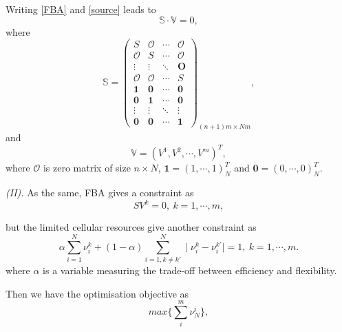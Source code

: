 \documentclass[paper=a4, fontsize=12pt]{scrartcl}	%
\numberwithin{equation}{section}					%
\numberwithin{figure}{section}					%
\numberwithin{table}{section}					%
\begin{document}
Writing \eqref{FBA} and \eqref{source} leads to 
\begin{equation}
\mathbb S\cdot \mathbb V=0,
\end{equation}
where 
\begin{equation}
\nonumber \mathbb S =\left(\begin{array}{cccc}  S & \mathcal O & \cdots & \mathcal O \\
							\mathcal O & S & \cdots & \mathcal O \\
							\vdots & \vdots & \ddots & \mathbf O \\
							\mathcal O & \mathcal O & \cdots & S \\ 
							\mathbf 1 &  \mathbf 0 & \cdots & \mathbf 0 \\ 
							\mathbf 0 &  \mathbf 1 & \cdots & \mathbf 0 \\ 
							\vdots & \vdots & \ddots & \vdots \\ 
							\mathbf 0 & \mathbf 0 & \cdots & \mathbf 1\end{array}\right)_{(n+1)m\times Nm},
\end{equation}
and
\begin{equation}
\nonumber \mathbb V=(V^1, V^2, \cdots, V^m)^T,
\end{equation}
where $\mathcal O$ is zero matrix of size $n\times N$,  $\mathbf 1 =(1, \cdots, 1)_{N}^T$ and $\mathbf 0 =(0, \cdots, 0)_{N}^T$. 

{\it (II).} As the same, FBA gives a constraint as 
\begin{equation}
\label{FBA1}
SV^k=0,\ k=1,\cdots,m,
\end{equation}

but the limited cellular resources give another constraint as
\begin{equation}
\label{source1} \alpha \sum_{i=1}^N\nu_i^k +(1-\alpha)\sum_{i=1, k\neq k'}^N\mid \nu_i^k-\nu_i^{k'}\mid=1,\ k=1,\cdots,m.
\end{equation}
where $\alpha$ is a variable measuring the trade-off between efficiency and flexibility.

Then we have the optimisation objective as
\begin{equation}\label{objective1}
max\{ \sum_i^m  \nu_{N}^i \}, 
\end{equation}
\end{document}
